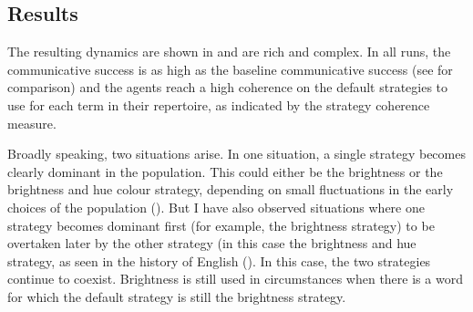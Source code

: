 \subsection{Results}

The resulting dynamics are shown in  and are
rich and complex. In all runs, the communicative success is as high as
the baseline communicative success (see  for comparison) and the agents reach a
high coherence on the default strategies to use for each term in their
repertoire, as indicated by the strategy coherence measure.

Broadly speaking, two situations arise. In one situation, a single
strategy becomes clearly dominant in the population. This could either
be the brightness or the brightness and hue colour strategy, depending
on small fluctuations in the early choices of the population (). But I have also observed situations where one
strategy becomes dominant first (for example, the brightness
  strategy) to be overtaken later by the other strategy (in this case
the brightness and hue strategy, as seen in the history of
English (). In this case, the two
strategies continue to coexist. Brightness is still used
in circumstances when there is a word for which the default strategy
is still the brightness strategy.

